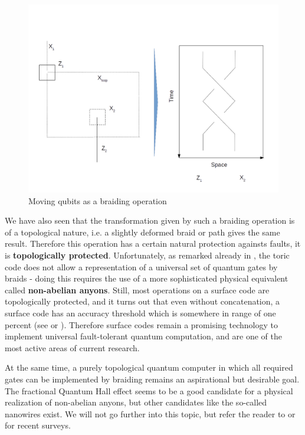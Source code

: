 \documentclass[a4paper, draft]{article}
\theoremstyle{own}
\theoremstyle{remark}
\begin{document}
\begin{figure}[ht]
\centering
\includegraphics[width=0.7\linewidth]{images/Braids}
\caption[Moving qubits as a braiding operation]{Moving qubits as a braiding operation}
\label{fig:Braids}
\end{figure}

We have also seen that the transformation given by such a braiding operation is of a topological nature, i.e. a slightly deformed braid or path gives the same result. Therefore this operation has a certain natural protection againsts faults, it is {\bf topologically protected}. Unfortunately, as remarked already in \cite{Kitaev}, the toric code does not allow a representation of a universal set of quantum gates by braids - doing this requires the use of a more sophisticated physical equivalent called {\bf non-abelian anyons}. Still, most operations on a surface code are topologically protected, and it turns out that even without concatenation, a surface code has an accuracy threshold which is somewhere in range of one percent (see \cite{DKLP} or \cite{SurfaceCodes}). Therefore surface codes remain a promising technology to implement universal fault-tolerant quantum computation, and are one of the most active areas of current research. 

At the same time, a purely topological quantum computer in which all required gates can be implemented by braiding remains an aspirational but desirable goal. The fractional Quantum Hall effect seems to be a good candidate for a physical realization of non-abelian anyons, but other candidates like the so-called nanowires exist. We will not go further into this topic, but refer the reader to \cite{TQCSurvey2017}or \cite{Fibonacci} for recent surveys.

\appendix


\end{document}
